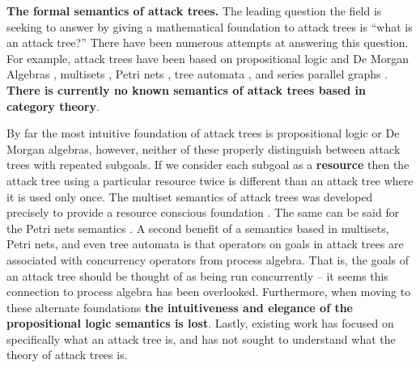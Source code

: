 \documentclass{llncs}
\begin{document}
\textbf{The formal semantics of attack trees.} The leading question
the field is seeking to answer by giving a mathematical foundation to
attack trees is ``what is an attack tree?''  There have been numerous
attempts at answering this question.  For example, attack trees have
been based on propositional logic and De Morgan Algebras
\cite{Kordy:2014,Kordy:2012,Pietre-Cambacedes:2010}, multisets
\cite{Mauw:2006}, Petri nets \cite{McDermott:2001}, tree automata
\cite{Camtepe:2007}, and series parallel graphs
\cite{Jhawar:2015}. \textbf{There is currently no known semantics of
  attack trees based in category theory}.

By far the most intuitive foundation of attack trees is propositional
logic or De Morgan algebras, however, neither of these properly
distinguish between attack trees with repeated subgoals.  If we
consider each subgoal as a \textbf{resource} then the attack tree
using a particular resource twice is different than an attack tree
where it is used only once.  The multiset semantics of attack trees
was developed precisely to provide a resource conscious foundation
\cite{Mauw:2006}. The same can be said for the Petri nets semantics
\cite{McDermott:2001}.  A second benefit of a semantics based in
multisets, Petri nets, and even tree automata is that operators on
goals in attack trees are associated with concurrency operators from
process algebra.  That is, the goals of an attack tree should be
thought of as being run concurrently -- it seems this connection to
process algebra has been overlooked.  Furthermore, when moving to
these alternate foundations \textbf{the intuitiveness and elegance of
  the propositional logic semantics is lost}.  Lastly, existing work
has focused on specifically what an attack tree is, and has not sought
to understand what the theory of attack trees is.
\end{document}

